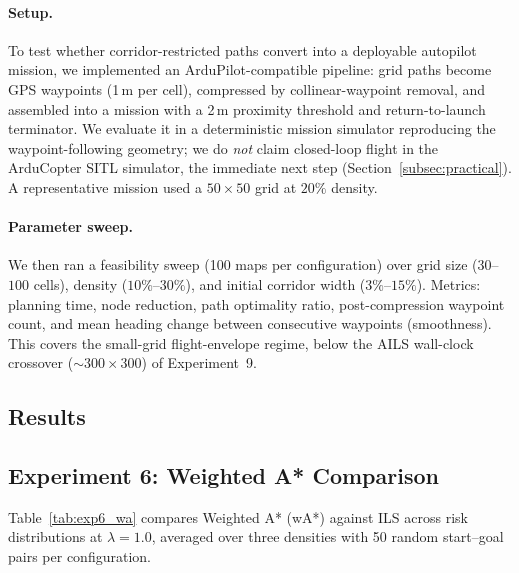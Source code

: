 \documentclass[11pt]{article}
\begin{document}
\paragraph{Setup.}
To test whether corridor-restricted paths convert into a deployable autopilot mission, we implemented an ArduPilot-compatible pipeline: grid paths become GPS waypoints (1\,m per cell), compressed by collinear-waypoint removal, and assembled into a mission with a 2\,m proximity threshold and return-to-launch terminator. We evaluate it in a deterministic mission simulator reproducing the waypoint-following geometry; we do \emph{not} claim closed-loop flight in the ArduCopter SITL simulator, the immediate next step (Section~\ref{subsec:practical}). A representative mission used a $50 \times 50$ grid at $20\%$ density.

\paragraph{Parameter sweep.}
We then ran a feasibility sweep (100 maps per configuration) over grid size ($30$--$100$ cells), density ($10\%$--$30\%$), and initial corridor width ($3\%$--$15\%$). Metrics: planning time, node reduction, path optimality ratio, post-compression waypoint count, and mean heading change between consecutive waypoints (smoothness). This covers the small-grid flight-envelope regime, below the AILS wall-clock crossover (${\sim}300 \times 300$) of Experiment~9.


\subsection*{Results}

\subsection{Experiment 6: Weighted A* Comparison}

Table~\ref{tab:exp6_wa} compares Weighted A* (wA*) against ILS across risk distributions at $\lambda = 1.0$, averaged over three densities with 50 random start--goal pairs per configuration.
\end{document}
